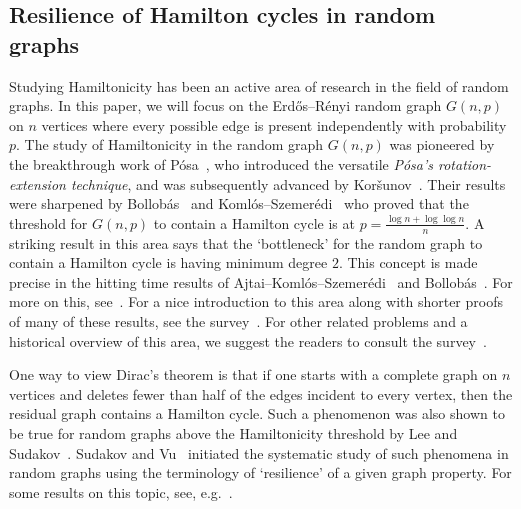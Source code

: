 \documentclass[10pt,a4paper,reqno]{amsart}
\begin{document}
\subsection{Resilience of Hamilton cycles in random graphs}
Studying Hamiltonicity has been an active area of research in the field of random graphs. In this paper, we will focus on the Erd\H{o}s--R\'enyi random graph $G(n,p)$ on $n$ vertices where every possible edge is present independently with probability $p$.
The study of Hamiltonicity in the random graph $G(n,p)$ was pioneered by the breakthrough work of P\'osa~\cite{Posa1976Hamiltonian}, who introduced the versatile \emph{P\'osa's rotation-extension technique}, and was subsequently advanced by Kor\v{s}unov~\cite{Korsunov1977solution}. Their results were sharpened by Bollob\'as~\cite{Bollobas1984the} and Koml\'os--Szemer\'edi~\cite{Komlos1983limit} who proved that the threshold for $G(n,p)$ to contain a Hamilton cycle is at $p=\frac{\log{n} + \log\log{n}}{n}$.
A striking result in this area says that the `bottleneck' for the random graph to contain a Hamilton cycle is having minimum degree $2$. This concept is made precise in the hitting time results of Ajtai--Koml\'os--Szemer\'edi~\cite{Ajtai1985First} and Bollob\'as~\cite{Bollobas1984the}. For more on this, see~. For a nice introduction to this area along with shorter proofs of many of these results, see the survey~\cite{Krivelevich2015Hamiltonicity}. For other related problems and a historical overview of this area, we suggest the readers to consult the survey~\cite{Frieze2019hamilton}.


One way to view Dirac's theorem is that if one starts with a complete graph on $n$ vertices and deletes fewer than half of the edges incident to every vertex, then the residual graph contains a Hamilton cycle. Such a phenomenon was also shown to be true for random graphs above the Hamiltonicity threshold by Lee and Sudakov~\cite{Lee2012Dirac}. Sudakov and Vu~\cite{Sudakov2008local} initiated the systematic study of such phenomena in random graphs using the terminology of `resilience' of a given graph property. For some results on this topic, see, e.g.~\cite{Allen2020the,Alon2010increasing,Balogh2011local,Bottcher2013almost,Conlon2016combinatorial,Haxell1995turan,Haxell1996turan,Huang2012bandwidth,Lee2012Dirac,Schacht2016extremal}. 
\end{document}
